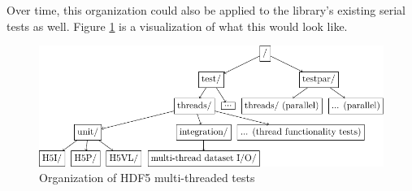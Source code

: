 \documentclass[../HDF5_RFC.tex]{subfiles}
\begin{document}
Over time, this organization could also be applied to the library's existing serial tests as well. Figure \ref{fig:mt_test_dirs} is a visualization of what this would look like.

\begin{figure}
    \centering
    \includegraphics[width=0.8\linewidth]{images/MT_test_dirs.pdf}
    \caption{Organization of HDF5 multi-threaded tests}
    \label{fig:mt_test_dirs}
\end{figure}
\end{document}
